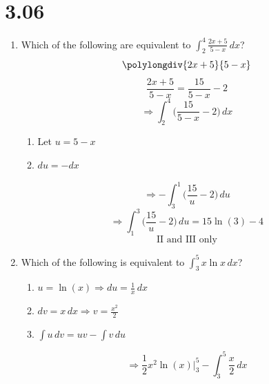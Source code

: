 \documentclass[12pt]{article}
\begin{document}
\section*{3.06}
\newpage
\begin{enumerate}
    \item Which of the following are equivalent to $\int_{2}^{4}\frac{2x+5}{5-x} \, dx$?
   $$\polylongdiv{2x+5}{5-x}$$
   $$\frac{2x+5}{5-x} = \frac{15}{5-x} -2$$
   $$\Longrightarrow  \int_{2}^{4} \biggr(\frac{15}{5-x} -2 \biggr) \, dx$$
\begin{enumerate}
    \item Let $u=5-x $
    \item $du=-dx$
\end{enumerate}
$$\Longrightarrow -\int_{3}^{1} \biggr(\frac{15}{u} -2 \biggr) \, du $$
$$\Longrightarrow \int_{1}^{3} \biggr(\frac{15}{u} -2 \biggr) \, du = 15\ln(3)-4$$
$$\boxed{\text{II and III only}}$$

   
    \item Which of the following is equivalent to $\int_{3}^{5} x \ln x \, dx$?
\begin{enumerate}
    \item $u=\ln(x) \Longrightarrow du= \frac{1}{x} \, dx$
    \item $dv=x \,dx \Longrightarrow v=\frac{x^2}{2}$
    \item $\int u \, dv = uv- \int v \, du$
\end{enumerate}
$$\boxed{\Longrightarrow \frac{1}{2}x^2\ln(x) \biggr\rvert_{3}^{5} -\int_{3}^{5} \frac{x}{2} \, dx}$$
    

\end{enumerate}
\end{document}
